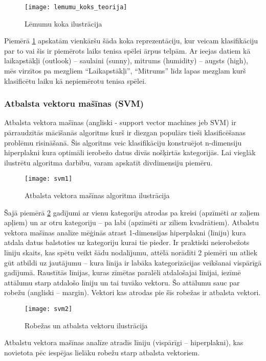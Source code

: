 \begin{figure}[H]
	\texttt{[image: lemumu\_koks\_teorija]}
	\caption{Lēmumu koka ilustrācija \cite{mitchell1997} }
	\label{fig:lemumu_koks_teorija}
\end{figure}

Piemērā \ref{fig:lemumu_koks_teorija} apskatām vienkāršu šāda koka reprezentāciju, kur veicam klasifikāciju par to vai šis ir piemērots laiks tenisa spēlei ārpus telpām. Ar ieejas datiem kā laikapstākļi (outlook) – saulaini (sunny), mitrums (humidity) – augsts (high), mēs virzītos pa mezgliem “Laikapstākļi”, “Mitrums” līdz lapas mezglam kurš klasificētu laiku kā nepiemērotu tenisa spēlei.

\subsubsection{Atbalsta vektoru mašīnas (SVM)}

Atbalsta vektora mašīnas \cite{supportvectornetworks} (angliski - support vector machines jeb SVM) ir pārraudzītās mācīšanās algoritms kurš ir diezgan populārs tieši klasificēšanas problēmu risināšanā. Šis algoritms veic klasifikāciju konstruējot n-dimensiju hiperplakni kura optimāli ierobežo datus divās nošķirtās kategorijās. Lai vieglāk ilustrētu algoritma darbību, varam apskatīt divdimensiju piemēru.
\begin{figure}[H]
	\texttt{[image: svm1]}
	\caption{Atbalsta vektora mašīnas algoritma ilustrācija \cite{supportvectornetworks} }
	\label{fig:svm1}
\end{figure}
Šajā piemērā \ref{fig:svm1} gadījumi ar vienu kategoriju atrodas pa kreisi (apzīmēti ar zaļiem apļiem) un ar otru kategoriju – pa labi (apzīmēti ar ziliem kvadrātiem). Atbalstu vektora mašīnas analīze mēģinās atrast 1-dimensijas hiperplakni (līniju) kura atdala datus balstoties uz kategoriju kurai tie pieder. Ir praktiski neierobežots līniju skaits, kas spētu veikt šādu nodalījumu, attēlā norādīti 2 piemēri un atliek gūt atbildi uz jautājumu – kura līnija ir labāka kategorizācijas veikšanai vispārīgā gadījumā. Raustītās līnijas, kuras zīmētas paralēli atdalošajai līnijai, iezīmē attālumu starp atdalošo līniju un tai tuvāko vektoru. Šo attālumu sauc par robežu (angliski – margin). Vektori kas atrodas pie šīs robežas ir atbalsta vektori.
\begin{figure}[H]
	\texttt{[image: svm2]}
	\caption{Robežas un atbalsta vektoru ilustrācija \cite{supportvectornetworks} }
	\label{fig:svm2}
\end{figure}
Atbalstu vektora mašīnas analīze atradīs līniju (vispārīgi – hiperplakni), kas novietota pēc iespējas lielāku robežu starp atbalsta vektoriem.

